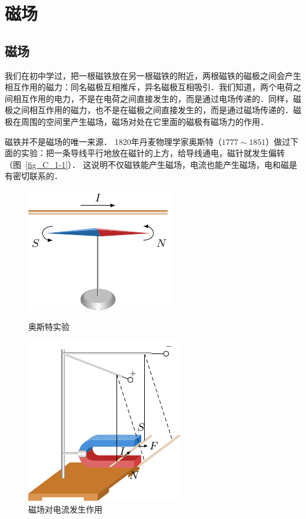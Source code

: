 \chapter{磁场}\label{chapter-magnetic-field}

\section{磁场}
我们在初中学过，把一根磁铁放在另一根磁铁的附近，两根磁铁的磁极之间会产生相互作用的磁力：同名磁极互相推斥，异名磁极互相吸引．我们知道，两个电荷之间相互作用的电力，不是在电荷之间直接发生的，而是通过电场传递的．同样，磁极之间相互作用的磁力，也不是在磁极之间直接发生的，而是通过磁场传递的．磁极在周围的空间里产生磁场，磁场对处在它里面的磁极有磁场力的作用．

磁铁并不是磁场的唯一来源．
1820年丹麦物理学家奥斯特（$1777 \sim 1851$）做过下面的实验：把一条导线平行地放在磁针的上方，给导线通电，磁针就发生偏转（图~\ref{fig_C_1-1}）．
这说明不仅磁铁能产生磁场，电流也能产生磁场，电和磁是有密切联系的．
\begin{figure}[htbp]
    \centering
    \begin{minipage}[t]{0.48\textwidth}
        \centering
        \includegraphics{fig/C/1-1.pdf}
        \caption{奥斯特实验}\label{fig_C_1-1}
    \end{minipage}
    \begin{minipage}[t]{0.48\textwidth}
        \centering
        \includegraphics{fig/C/1-2.pdf}
        \caption{磁场对电流发生作用}\label{fig_C_1-2}
    \end{minipage}
\end{figure}

